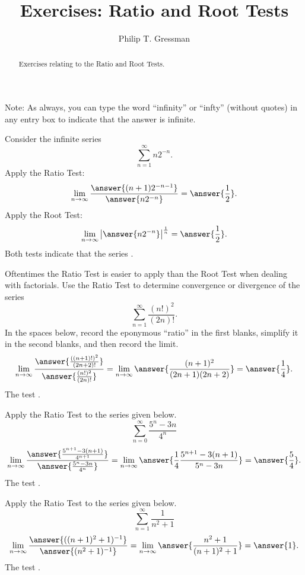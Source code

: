 \documentclass{ximera}
\title{Exercises: Ratio and Root Tests}
\author{Philip T. Gressman}
\begin{document}
\begin{abstract}
Exercises relating to the Ratio and Root Tests.
\end{abstract}
\maketitle


Note: As always, you can type the word ``infinity'' or ``infty'' (without quotes) in any entry box to indicate that the answer is infinite.

\begin{exercise}
Consider the infinite series
\[ \sum_{n=1}^\infty n 2^{-n}. \]
Apply the Ratio Test:
\[ \lim_{n \rightarrow \infty} \frac{\answer{(n+1) 2^{-n-1}}}{\answer{n 2^{-n}}} = \answer{\frac{1}{2}}. \]
Apply the Root Test:
\[ \lim_{n \rightarrow \infty} \left| \answer{n 2^{-n}} \right|^{\frac{1}{n}} = \answer{\frac{1}{2}}. \]
Both tests indicate that the series .
\end{exercise}

\begin{exercise}
Oftentimes the Ratio Test is easier to apply than the Root Test when dealing with factorials. Use the Ratio Test to determine convergence or divergence of the series
\[ \sum_{n=1}^\infty \frac{(n!)^2}{(2n)!}. \]
In the spaces below, record the eponymous ``ratio'' in the first blanks, simplify it in the second blanks, and then record the limit.
\[ \lim_{n \rightarrow \infty} \frac{\answer{\frac{((n+1)!)^2}{(2n+2)!}}}{\answer{\frac{(n!)^2}{(2n)!}}} = \lim_{n \rightarrow \infty} \answer{\frac{(n+1)^2}{(2n+1)(2n+2)}} = \answer{\frac{1}{4}}. \]
The test .
\end{exercise}

\begin{exercise}%
Apply the Ratio Test to the series given below.
\[ \sum_{n=0}^\infty \frac{5^n-3n}{4^n} \]
\[ \lim_{n \rightarrow \infty} \frac{\answer{\frac{5^{n+1}-3(n+1)}{4^{n+1}}}}{\answer{\frac{5^n-3n}{4^n}}} = \lim_{n \rightarrow \infty} \answer{\frac{1}{4} \frac{5^{n+1} - 3(n+1)}{5^n - 3n}} = \answer{\frac{5}{4}}. \]
The test .
\end{exercise}

\begin{exercise}
Apply the Ratio Test to the series given below.
\[ \sum_{n=1}^\infty \frac{1}{n^2+1} \]
\[ \lim_{n \rightarrow \infty} \frac{\answer{((n+1)^2+1)^{-1}}}{\answer{(n^2+1)^{-1}}} = \lim_{n \rightarrow \infty} \answer{\frac{n^2+1}{(n+1)^2+1}} = \answer{1}. \]
The test .
\end{exercise}
\end{document}

